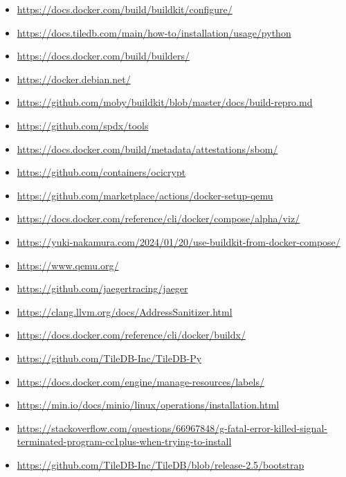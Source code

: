 \documentclass{article}
\begin{document}
\begin{itemize}
  \item \href{https://docs.docker.com/build/buildkit/configure/}{https://docs.docker.com/build/buildkit/configure/}
  \item \href{https://docs.tiledb.com/main/how-to/installation/usage/python}{https://docs.tiledb.com/main/how-to/installation/usage/python}
  \item \href{https://docs.docker.com/build/builders/}{https://docs.docker.com/build/builders/}
  \item \href{https://docker.debian.net/}{https://docker.debian.net/}
  \item \href{https://github.com/moby/buildkit/blob/master/docs/build-repro.md}{https://github.com/moby/buildkit/blob/master/docs/build-repro.md}
  \item \href{https://github.com/spdx/tools}{https://github.com/spdx/tools}
  \item \href{https://docs.docker.com/build/metadata/attestations/sbom/}{https://docs.docker.com/build/metadata/attestations/sbom/}
  \item \href{https://github.com/containers/ocicrypt}{https://github.com/containers/ocicrypt}
  \item \href{https://github.com/marketplace/actions/docker-setup-qemu}{https://github.com/marketplace/actions/docker-setup-qemu}
  \item \href{https://docs.docker.com/reference/cli/docker/compose/alpha/viz/}{https://docs.docker.com/reference/cli/docker/compose/alpha/viz/}
  \item \href{https://yuki-nakamura.com/2024/01/20/use-buildkit-from-docker-compose/}{https://yuki-nakamura.com/2024/01/20/use-buildkit-from-docker-compose/}
  \item \href{https://www.qemu.org/}{https://www.qemu.org/}
  \item \href{https://github.com/jaegertracing/jaeger}{https://github.com/jaegertracing/jaeger}
  \item \href{https://clang.llvm.org/docs/AddressSanitizer.html}{https://clang.llvm.org/docs/AddressSanitizer.html}
  \item \href{https://docs.docker.com/reference/cli/docker/buildx/}{https://docs.docker.com/reference/cli/docker/buildx/}
  \item \href{https://github.com/TileDB-Inc/TileDB-Py}{https://github.com/TileDB-Inc/TileDB-Py}
  \item \href{https://docs.docker.com/engine/manage-resources/labels/}{https://docs.docker.com/engine/manage-resources/labels/}
  \item \href{https://min.io/docs/minio/linux/operations/installation.html}{https://min.io/docs/minio/linux/operations/installation.html}
  \item \href{https://stackoverflow.com/questions/66967848/g-fatal-error-killed-signal-terminated-program-cc1plus-when-trying-to-install}{https://stackoverflow.com/questions/66967848/g-fatal-error-killed-signal-terminated-program-cc1plus-when-trying-to-install}
  \item \href{https://github.com/TileDB-Inc/TileDB/blob/release-2.5/bootstrap}{https://github.com/TileDB-Inc/TileDB/blob/release-2.5/bootstrap}
\end{itemize}



\end{document}
